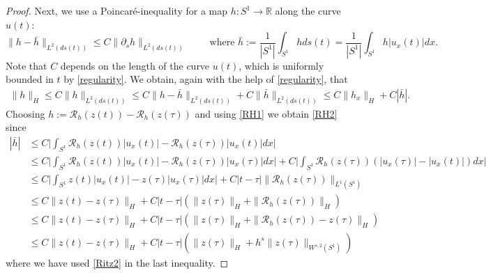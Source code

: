 \documentclass[a4paper,10pt]{article}
\newcommand{\R}{\mathbb{R}}
\def\funch{h}
\numberwithin{equation}{section}
\begin{document}
\begin{proof}
Next, we use a Poincar\'{e}-inequality for a map $\funch:S^{1} \to \R$ along the curve $u(t)$:
$$\| \funch - \bar{h}\|_{L^{2}(ds(t))} \leq C\| \partial_{s} \funch \|_{L^{2}(ds(t))} \qquad \text{ where } \bar{h}:= \frac{1}{|S^{1}|}\int_{S^{1}} \funch ds(t)= \frac{1}{|S^{1}|}\int_{S^{1}} \funch |u_{x}(t)| dx.$$
Note that $C$ depends on the length of the curve $u(t)$, which is uniformly bounded in $t$ by \eqref{regularity}. We obtain, again with the help of \eqref{regularity}, that
\begin{align*}
\|\funch\|_{H} \leq C \| \funch\|_{L^{2}(ds(t))} \leq C\| \funch - \bar{h}\|_{L^{2}(ds(t))} + C\| \bar{h}\|_{L^{2}(ds(t))} \leq C \| \funch_{x}\|_{H} + C |\bar{h}|.
\end{align*}
Choosing $\funch:=\mathcal{R}_{h} (z(t)) -\mathcal{R}_{h} (z(\tau)) $ and using \eqref{RH1} we obtain \eqref{RH2} since
\begin{align*}
|\bar{h}| &\leq C \Big|\int_{S^{1}} \mathcal{R}_{h} (z(t)) |u_{x}(t)| - \mathcal{R}_{h} (z(\tau)) |u_{x}(t)| dx \Big|\\
&\leq C \Big|\int_{S^{1}} \mathcal{R}_{h} (z(t)) |u_{x}(t)| - \mathcal{R}_{h} (z(\tau)) |u_{x}(\tau)| dx \Big| + C \Big|\int_{S^{1}} \mathcal{R}_{h} (z(\tau)) ( |u_{x}(\tau)| - |u_{x}(t)|) dx \Big|\\
& \leq C \Big|\int_{S^{1}} z(t) |u_{x}(t)| - z(\tau) |u_{x}(\tau)| dx \Big| + C |t -\tau| \| \mathcal{R}_{h} (z(\tau)) \|_{L^{1}(S^{1})}\\
& \leq C \| z(t) -z(\tau)\|_{H} + C |t -\tau| ( \| z(\tau)\|_{H} +\| \mathcal{R}_{h} (z(\tau)) \|_{H} )\\
&\leq C \| z(t) -z(\tau)\|_{H} + C |t -\tau| ( \| z(\tau)\|_{H} +\| \mathcal{R}_{h} (z(\tau)) -z(\tau)\|_{H} )\\
& \leq C \| z(t) -z(\tau)\|_{H} + C |t -\tau| (\| z(\tau)\|_{H} +h^{s}\| z(\tau)\|_{W^{s,2}(S^{1})})
\end{align*}
where we have used \eqref{Ritz2} in the last inequality.


\end{proof}
\end{document}
